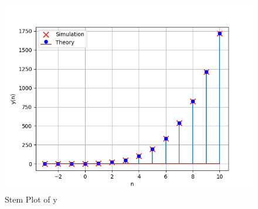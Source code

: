 \documentclass[journal,12pt,twocolumn]{IEEEtran}
\theoremstyle{remark}
\begin{document}
\begin{figure}[h!]
    \centering
    \includegraphics[width=1\linewidth]{figs/Figure_1.png}
    \caption{Stem Plot of y}
\end{figure}
\end{document}
